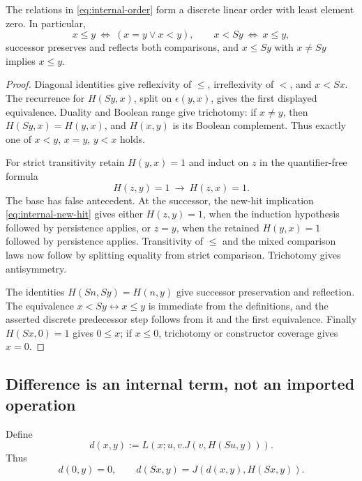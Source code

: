 \begin{lemma}
\label{lem:internal-linear-order}
The relations in \eqref{eq:internal-order} form a discrete linear order
with least element zero.  In particular,
\[
 x\le y\ \Longleftrightarrow\ (x=y\lor x<y),\qquad
 x<Sy\ \Longleftrightarrow\ x\le y,
\]
successor preserves and reflects both comparisons, and
$x\le Sy$ with $x\ne Sy$ implies $x\le y$.
\end{lemma}
\begin{proof}
Diagonal identities give reflexivity of $\le$, irreflexivity of $<$,
and $x<Sx$.  The recurrence for $H(Sy,x)$, split on $\epsilon(y,x)$,
gives the first displayed equivalence.  Duality and Boolean range give
trichotomy: if $x\ne y$, then $H(Sy,x)=H(y,x)$, and $H(x,y)$ is its
Boolean complement.  Thus exactly one of $x<y$, $x=y$, $y<x$ holds.

For strict transitivity retain $H(y,x)=1$ and induct on $z$ in the
quantifier-free formula
\[
                 H(z,y)=1\ \longrightarrow\ H(z,x)=1.
\]
The base has false antecedent.  At the successor, the new-hit implication
\eqref{eq:internal-new-hit} gives either $H(z,y)=1$, when the induction
hypothesis followed by persistence applies, or $z=y$, when the retained
$H(y,x)=1$ followed by persistence applies.  Transitivity of $\le$ and
the mixed comparison laws now follow by splitting equality from strict
comparison.  Trichotomy gives antisymmetry.

The identities $H(Sn,Sy)=H(n,y)$ give successor preservation and
reflection.  The equivalence $x<Sy\leftrightarrow x\le y$ is immediate
from the definitions, and the asserted discrete predecessor step follows
from it and the first equivalence.  Finally $H(Sx,0)=1$ gives $0\le x$;
if $x\le0$, trichotomy or constructor coverage gives $x=0$.
\end{proof}

\subsection{Difference is an internal term, not an imported operation}

Define
\[
 d(x,y):=L(x;u,v.J(v,H(Su,y))).
\]
Thus
\[
 d(0,y)=0,
 \qquad d(Sx,y)=J(d(x,y),H(Sx,y)).
 \tag{d}\label{eq:internal-difference-recursion}
\]

